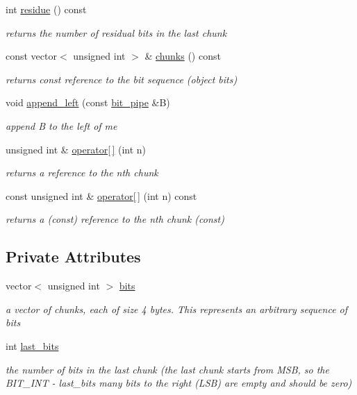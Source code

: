\begin{DoxyCompactItemize}
int \hyperlink{classbit__pipe_a283f47fa4422ac50b9b28e8f276f7252}{residue} () const
\begin{DoxyCompactList}\small\item\em returns the number of residual bits in the last chunk \end{DoxyCompactList}\item 
const vector$<$ unsigned int $>$ \& \hyperlink{classbit__pipe_aebf19a4d9425e5ca10fc4fd3d78cada2}{chunks} () const
\begin{DoxyCompactList}\small\item\em returns const reference to the bit sequence (object bits) \end{DoxyCompactList}\item 
void \hyperlink{classbit__pipe_a0b14715c897cba1713a0ea19ea2996d8}{append\+\_\+left} (const \hyperlink{classbit__pipe}{bit\+\_\+pipe} \&B)
\begin{DoxyCompactList}\small\item\em append B to the left of me \end{DoxyCompactList}\item 
unsigned int \& \hyperlink{classbit__pipe_a4ea1ac9d3b026ebf3f71a68fccd1d639}{operator\mbox{[}$\,$\mbox{]}} (int n)
\begin{DoxyCompactList}\small\item\em returns a reference to the nth chunk \end{DoxyCompactList}\item 
const unsigned int \& \hyperlink{classbit__pipe_a58c67130ac4b0fd511998f991c8ad58d}{operator\mbox{[}$\,$\mbox{]}} (int n) const
\begin{DoxyCompactList}\small\item\em returns a (const) reference to the nth chunk (const) \end{DoxyCompactList}\end{DoxyCompactItemize}
\subsection*{Private Attributes}
\begin{DoxyCompactItemize}
\item 
vector$<$ unsigned int $>$ \hyperlink{classbit__pipe_a86f38af1e9736b053728033490476b50}{bits}
\begin{DoxyCompactList}\small\item\em a vector of chunks, each of size 4 bytes. This represents an arbitrary sequence of bits \end{DoxyCompactList}\item 
int \hyperlink{classbit__pipe_a0f3e84b02751803adaab499b5dad86fe}{last\+\_\+bits}
\begin{DoxyCompactList}\small\item\em the number of bits in the last chunk (the last chunk starts from M\+SB, so the B\+I\+T\+\_\+\+I\+NT -\/ last\+\_\+bits many bits to the right (L\+SB) are empty and should be zero) \end{DoxyCompactList}\end{DoxyCompactItemize}
